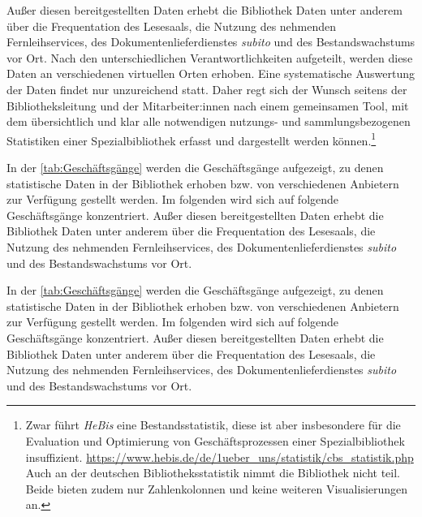 Außer diesen bereitgestellten Daten erhebt die Bibliothek Daten unter anderem über
die Frequentation des Lesesaals, die Nutzung des nehmenden Fernleihservices, des
Dokumentenlieferdienstes \textit{subito} und des Bestandswachstums vor Ort.
Nach den unterschiedlichen Verantwortlichkeiten aufgeteilt, werden diese Daten an verschiedenen virtuellen Orten erhoben.
Eine systematische Auswertung der Daten findet nur unzureichend statt.
Daher regt sich der Wunsch seitens der Bibliotheksleitung und der Mitarbeiter:innen nach einem gemeinsamen Tool,
mit dem übersichtlich und klar alle notwendigen nutzungs- und sammlungsbezogenen Statistiken einer
Spezialbibliothek erfasst und dargestellt werden können.\footnote{Zwar führt \textit{HeBis} eine Bestandsstatistik, diese ist aber insbesondere für die
Evaluation und Optimierung von Geschäftsprozessen einer Spezialbibliothek
insuffizient. \url{https://www.hebis.de/de/1ueber_uns/statistik/cbs_statistik.php} Auch an der deutschen Bibliotheksstatistik nimmt die Bibliothek nicht teil. Beide bieten zudem nur Zahlenkolonnen und keine weiteren Visualisierungen an.}

In der  \autoref{tab:Geschäftsgänge} werden die Geschäftsgänge aufgezeigt, zu denen statistische Daten
in der Bibliothek erhoben bzw. von verschiedenen Anbietern zur Verfügung gestellt werden. Im folgenden wird sich auf folgende
Geschäftsgänge konzentriert.
Außer diesen bereitgestellten Daten erhebt die Bibliothek Daten unter anderem über
die Frequentation des Lesesaals, die Nutzung des nehmenden Fernleihservices, des
Dokumentenlieferdienstes \textit{subito} und des Bestandswachstums vor Ort.

In der  \autoref{tab:Geschäftsgänge} werden die Geschäftsgänge aufgezeigt, zu denen statistische Daten
in der Bibliothek erhoben bzw. von verschiedenen Anbietern zur Verfügung gestellt werden. Im folgenden wird sich auf folgende
Geschäftsgänge konzentriert.
Außer diesen bereitgestellten Daten erhebt die Bibliothek Daten unter anderem über
die Frequentation des Lesesaals, die Nutzung des nehmenden Fernleihservices, des
Dokumentenlieferdienstes \textit{subito} und des Bestandswachstums vor Ort.

